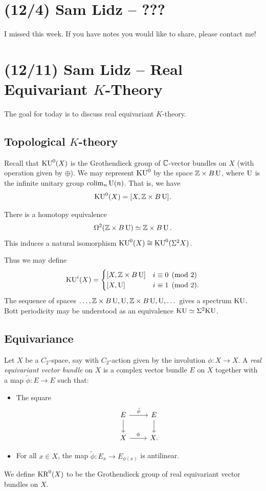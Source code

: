 \documentclass{article}
\begin{document}
\section{(12/4) Sam Lidz -- ???}

I missed this week.
If you have notes you would like to share, please contact me!

\section{(12/11) Sam Lidz -- Real Equivariant $K$-Theory} 

The goal for today is to discuss real equivariant $K$-theory.

\subsection{Topological $K$-theory}

Recall that $\mathrm{KU}^0(X)$ is the Grothendieck group of $\mathbb{C}$-vector bundles on $X$ (with operation given by $\oplus$).
We may represent $\mathrm{KU}^0$ by the space $\mathbb{Z} \times B\operatorname{U}$, where $\operatorname{U}$ is the infinite unitary group $\operatorname{colim}_n \operatorname{U}(n)$.
That is, we have
\[
  \mathrm{KU}^0(X) = [X, \mathbb{Z} \times B\operatorname{U}].
\]

\begin{thm}
  There is a homotopy equivalence
  \[
    \Omega^2(\mathbb{Z} \times B\operatorname{U}) \simeq \mathbb{Z} \times B\operatorname{U}.
  \]
  This induces a natural isomorphism $\mathrm{KU}^0(X) \cong \mathrm{KU}^0(\Sigma^2 X)$.
\end{thm}

Thus we may define
\[
  \KU^i(X) = \begin{cases}
    [X, \ZZ \times B\Urm] & i \equiv 0 \pmod{2} \\
    [X, \Urm] & i \equiv 1 \pmod{2}.
  \end{cases}
\]
The sequence of spaces $\dots, \mathbb{Z} \times B\operatorname{U}, \operatorname{U}, \mathbb{Z} \times B\operatorname{U}, \operatorname{U}, \dots$ gives a spectrum $\mathrm{KU}$.
Bott periodicity may be understood as an equivalence $\mathrm{KU} \simeq \Sigma^2 \mathrm{KU}$.

\subsection{Equivariance}

\begin{dfn}
  Let $X$ be a $C_2$-space, say with $C_2$-action given by the involution $\phi: X \to X$.
  A \emph{real equivariant vector bundle} on $X$ is a complex vector bundle $E$ on $X$ together with a map $\tilde{\phi}: E \to E$ such that:
  \begin{itemize}
    \item The square
      \[
        \begin{tikzcd}
          E \rar["\tilde{\phi}"] \dar & E \dar \\
          X \rar["\phi"] & X.
        \end{tikzcd}
      \]
    \item For all $x \in X$, the map $\tilde{\phi}: E_x \to E_{\phi(x)}$ is antilinear.
  \end{itemize}
  We define $\mathrm{KR}^0(X)$ to be the Grothendieck group of real equivariant vector bundles on $X$.
\end{dfn}
\end{document}
